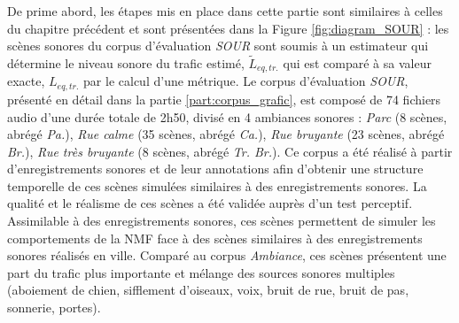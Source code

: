 De prime abord, les étapes mis en place dans cette partie sont similaires à celles du chapitre précédent et sont présentées dans la Figure \ref{fig:diagram_SOUR} : les scènes sonores du corpus d'évaluation \textit{SOUR} sont soumis à un estimateur qui détermine le niveau sonore du trafic estimé, $\tilde{L}_{eq,tr.}$ qui est comparé à sa valeur exacte, $L_{eq,tr.}$ par le calcul d'une métrique.
Le corpus d'évaluation \textit{SOUR}, présenté en détail dans la partie \ref{part:corpus_grafic}, est composé de 74 fichiers audio d'une durée totale de 2h50, divisé en 4 ambiances sonores : \textit{Parc} (8 scènes, abrégé \textit{Pa.}), \textit{Rue calme} (35 scènes, abrégé \textit{Ca.}), \textit{Rue bruyante} (23 scènes, abrégé \textit{Br.}), \textit{Rue très bruyante} (8 scènes, abrégé \textit{Tr. Br.}). Ce corpus a été réalisé à partir d'enregistrements sonores et de leur annotations afin d'obtenir une structure temporelle de ces scènes simulées similaires à des enregistrements sonores. La qualité et le réalisme de ces scènes a été validée auprès d'un test perceptif. Assimilable à des enregistrements sonores, ces scènes permettent de simuler les comportements de la NMF face à des scènes similaires à des enregistrements sonores réalisés en ville. Comparé au corpus \textit{Ambiance}, ces scènes présentent une part du trafic plus importante et mélange des sources sonores multiples (aboiement de chien, sifflement d'oiseaux, voix, bruit de rue, bruit de pas, sonnerie, portes).

